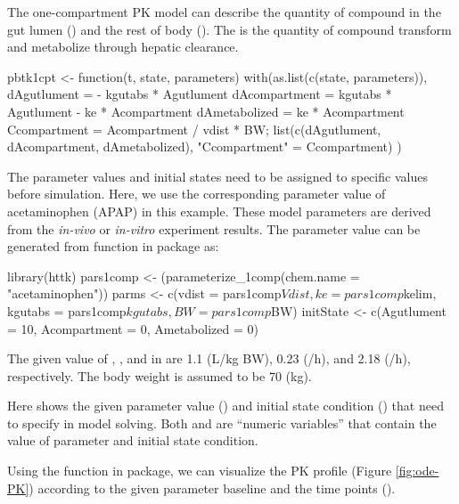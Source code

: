 The one-compartment PK model can describe the quantity of compound in
the gut lumen () and the rest of body
(). The  is the quantity of
compound transform and metabolize through hepatic clearance.

\begin{Schunk}
\begin{Sinput}
pbtk1cpt <- function(t, state, parameters) {
  with(as.list(c(state, parameters)), {
    dAgutlument = - kgutabs * Agutlument
    dAcompartment = kgutabs * Agutlument - ke * Acompartment
    dAmetabolized = ke * Acompartment
    Ccompartment = Acompartment / vdist * BW;
    list(c(dAgutlument, dAcompartment, dAmetabolized), 
         "Ccompartment" = Ccompartment) 
  })
}
\end{Sinput}
\end{Schunk}

The parameter values and initial states need to be assigned to specific
values before simulation. Here, we use the corresponding parameter value
of acetaminophen (APAP) in this example. These model parameters are
derived from the \emph{in-vivo} or \emph{in-vitro} experiment results.
The parameter value can be generated from 
function in  package as:

\begin{Schunk}
\begin{Sinput}
library(httk)
pars1comp <- (parameterize_1comp(chem.name = "acetaminophen"))
parms <- c(vdist = pars1comp$Vdist, 
           ke = pars1comp$kelim, 
           kgutabs = pars1comp$kgutabs, 
           BW = pars1comp$BW)
initState <- c(Agutlument = 10, Acompartment = 0, Ametabolized = 0)
\end{Sinput}
\end{Schunk}

The given value of , , and  in
 are 1.1 (L/kg BW), 0.23 (/h), and 2.18 (/h),
respectively. The body weight is assumed to be 70 (kg).

Here shows the given parameter value () and initial state
condition () that need to specify in model solving. Both
 and  are ``numeric variables'' that contain
the value of parameter and initial state condition.

Using the  function in  package, we can
visualize the PK profile (Figure \ref{fig:ode-PK}) according to the
given parameter baseline and the time points ().

